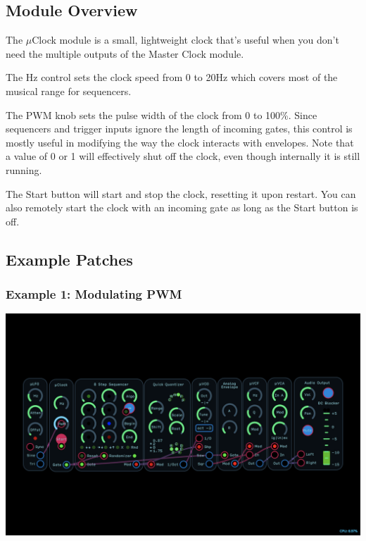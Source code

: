 \documentclass[11pt]{book}
\begin{document}
\pagebreak

\begin{multicols*}{2}

\subsection*{Module Overview}

The $\mu$Clock module is a small, lightweight clock that's useful when you don't need the multiple outputs of the Master Clock module.

The Hz control sets the clock speed from 0 to 20Hz which covers most of the musical range for sequencers.

The PWM knob sets the pulse width of the clock from 0 to 100\%. Since sequencers and trigger inputs ignore the length of incoming gates, this control is mostly useful in modifying the way the clock interacts with envelopes. Note that a value of 0 or 1 will effectively shut off the clock, even though internally it is still running.

The Start button will start and stop the clock, resetting it upon restart. You can also remotely start the clock with an incoming gate as long as the Start button is off.

\subsection*{Example Patches}

\subsubsection*{Example 1: Modulating PWM}

\begin{center}
\includegraphics[width=0.95\linewidth]{uclock-fig1.png}
\end{center}


\end{multicols*}
\end{document}
